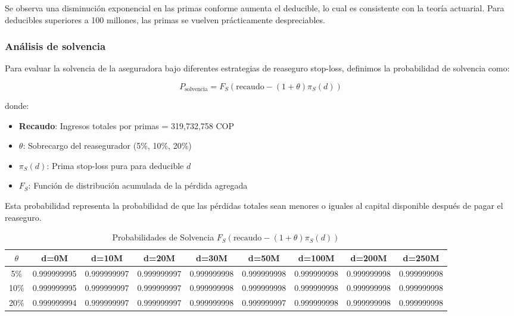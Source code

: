 Se observa una disminución exponencial en las primas conforme aumenta el deducible, lo cual es consistente con la teoría actuarial. Para deducibles superiores a 100 millones, las primas se vuelven prácticamente despreciables.

\subsubsection{Análisis de solvencia}

Para evaluar la solvencia de la aseguradora bajo diferentes estrategias de reaseguro stop-loss, definimos la probabilidad de solvencia como:

$$P_{\text{solvencia}} = F_S(\text{recaudo} - (1+\theta)\pi_S(d))$$

donde:
\begin{itemize}
\item \textbf{Recaudo}: Ingresos totales por primas = 319,732,758 COP
\item \textbf{$\theta$}: Sobrecargo del reasegurador (5\%, 10\%, 20\%)
\item \textbf{$\pi_S(d)$}: Prima stop-loss pura para deducible $d$
\item \textbf{$F_S$}: Función de distribución acumulada de la pérdida agregada
\end{itemize}

Esta probabilidad representa la probabilidad de que las pérdidas totales sean menores o iguales al capital disponible después de pagar el reaseguro.

\begin{table}[H]
\centering
\caption{Probabilidades de Solvencia $F_S(\text{recaudo} - (1+\theta)\pi_S(d))$}
\scriptsize
\begin{tabular}{|c|c|c|c|c|c|c|c|c|}
\hline
\textbf{$\theta$} & \textbf{d=0M} & \textbf{d=10M} & \textbf{d=20M} & \textbf{d=30M} & \textbf{d=50M} & \textbf{d=100M} & \textbf{d=200M} & \textbf{d=250M} \\
\hline
5\% & 0.999999995 & 0.999999997 & 0.999999997 & 0.999999998 & 0.999999998 & 0.999999998 & 0.999999998 & 0.999999998 \\
10\% & 0.999999995 & 0.999999997 & 0.999999997 & 0.999999998 & 0.999999998 & 0.999999998 & 0.999999998 & 0.999999998 \\
20\% & 0.999999994 & 0.999999997 & 0.999999997 & 0.999999998 & 0.999999997 & 0.999999998 & 0.999999998 & 0.999999998 \\
\hline
\end{tabular}
\end{table}


